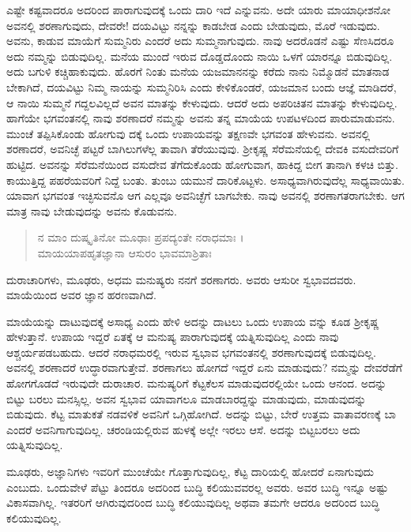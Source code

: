 ಎಷ್ಟೇ ಕಷ್ಟವಾದರೂ ಅದರಿಂದ ಪಾರಾಗುವುದಕ್ಕೆ ಒಂದು ದಾರಿ ಇದೆ ಎನ್ನುವನು. ಅದೇ ಯಾರು ಮಾಯಾಧೀಶನೋ ಅವನಲ್ಲಿ ಶರಣಾಗುವುದು, ದೇವರೇ! ದಯವಿಟ್ಟು ನನ್ನನ್ನು ಕಾಡಬೇಡ ಎಂದು ಬೇಡುವುದು, ಮೊರೆ ಇಡುವುದು. ಅವನು, ಕಾಡುವ ಮಾಯೆಗೆ ಸುಮ್ಮನಿರು ಎಂದರೆ ಅದು ಸುಮ್ಮನಾಗುವುದು. ನಾವು ಅದರೊಡನೆ ಎಷ್ಟು ಸೆಣಸಿದರೂ ಅದು ನಮ್ಮನ್ನು ಬಿಡುವುದಿಲ್ಲ. ಮನೆಯ ಮುಂದೆ ಇರುವ ದೊಡ್ಡದೊಂದು ನಾಯಿ ಒಳಗೆ ಯಾರನ್ನೂ ಬಿಡುವುದಿಲ್ಲ. ಅದು ಬಗುಳಿ ಕಚ್ಚಿಹಾಕುವುದು. ಹೊರಗೆ ನಿಂತು ಮನೆಯ ಯಜಮಾನನನ್ನು ಕರೆದು ನಾನು ನಿಮ್ಮೊಡನೆ ಮಾತನಾಡ ಬೇಕಾಗಿದೆ, ದಯವಿಟ್ಟು ನಿಮ್ಮ ನಾಯನ್ನು ಸುಮ್ಮನಿರಿಸಿ ಎಂದು ಕೇಳಿಕೊಂಡರೆ, ಯಜಮಾನ ಬಂದು ಆಜ್ಞೆ ಮಾಡಿದರೆ, ಆ ನಾಯಿ ಸುಮ್ಮನೆ ಗದ್ದಲವಿಲ್ಲದೆ ಅವನ ಮಾತನ್ನು ಕೇಳುವುದು. ಆದರೆ ಅದು ಅಪರಿಚಿತನ ಮಾತನ್ನು ಕೇಳುವುದಿಲ್ಲ. ಹಾಗೆಯೇ ಭಗವಂತನಲ್ಲಿ ನಾವು ಶರಣಾದರೆ ನಮ್ಮನ್ನು ಅವನು ತನ್ನ ಮಾಯೆಯ ಉಪಟಳದಿಂದ ಪಾರುಮಾಡುವನು. ಮುಂಚೆ ತಪ್ಪಿಸಿಕೊಂಡು ಹೋಗುವು ದಕ್ಕೆ ಒಂದು ಉಪಾಯವನ್ನು ತಕ್ಷಣವೇ ಭಗವಂತ ಹೇಳುವನು. ಅವನಲ್ಲಿ ಶರಣಾದರೆ, ಅವನಿಚ್ಛೆ ಪಟ್ಟರೆ ಬಾಗಿಲುಗಳೆಲ್ಲ ತಾವಾಗಿ ತೆರೆಯುವುವು. ಶ್ರೀಕೃಷ್ಣ ಸೆರೆಮನೆಯಲ್ಲಿ ದೇವಕಿ ವಸುದೇವರಿಗೆ ಹುಟ್ಟಿದ. ಅವನನ್ನು ಸೆರೆಮನೆಯಿಂದ ವಸುದೇವ ತೆಗೆದುಕೊಂಡು ಹೋಗುವಾಗ, ಹಾಕಿದ್ದ ಬೀಗ ತಾನಾಗಿ ಕಳಚಿ ಬಿತ್ತು. ಕಾಯುತ್ತಿದ್ದ ಪಹರೆಯವರಿಗೆ ನಿದ್ದೆ ಬಂತು. ತುಂಬು ಯಮುನೆ ದಾರಿಕೊಟ್ಟಳು. ಅಸಾಧ್ಯವಾಗಿರುವುದೆಲ್ಲ ಸಾಧ್ಯವಾಯಿತು. ಯಾವಾಗ ಭಗವಂತ ಇಚ್ಛಿಸುವನೊ ಆಗ ಎಲ್ಲವೂ ಅವನಿಚ್ಛೆಗೆ ಬಾಗಬೇಕು. ನಾವು ಅವನಲ್ಲಿ ಶರಣಾಗತರಾಗಬೇಕು. ಆಗ ಮಾತ್ರ ನಾವು ಬೇಡುವುದನ್ನು ಅವನು ಕೊಡುವನು.

\begin{verse}
ನ ಮಾಂ ದುಷ್ಕೃತಿನೋ ಮೂಢಾಃ ಪ್ರಪದ್ಯಂತೇ ನರಾಧಮಾಃ ।\\ಮಾಯಯಾಪಹೃತಜ್ಞಾನಾ ಆಸುರಂ ಭಾವಮಾಶ್ರಿತಾಃ 
\end{verse}

{\small ದುರಾಚಾರಿಗಳು, ಮೂಢರು, ಅಧಮ ಮನುಷ್ಯರು ನನಗೆ ಶರಣಾಗರು. ಅವರು ಆಸುರೀ ಸ್ವಭಾವದವರು. ಮಾಯೆಯಿಂದ ಅವರ ಜ್ಞಾನ ಹರಣವಾಗಿದೆ. }

ಮಾಯೆಯನ್ನು ದಾಟುವುದಕ್ಕೆ ಅಸಾಧ್ಯ ಎಂದು ಹೇಳಿ ಅದನ್ನು ದಾಟಲು ಒಂದು ಉಪಾಯ ವನ್ನು ಕೂಡ ಶ್ರೀಕೃಷ್ಣ ಹೇಳುತ್ತಾನೆ. ಉಪಾಯ ಇದ್ದರೆ ಏತಕ್ಕೆ ಆ ಮನುಷ್ಯ ಪಾರಾಗುವುದಕ್ಕೆ ಯತ್ನಿಸುವುದಿಲ್ಲ ಎಂದು ನಾವು ಆಶ್ಚರ್ಯಪಡಬಹುದು. ಆದರೆ ನರಾಧಮರಲ್ಲಿ ಇರುವ ಸ್ವಭಾವ ಭಗವಂತನಲ್ಲಿ ಶರಣಾಗುವುದಕ್ಕೆ ಬಿಡುವುದಿಲ್ಲ. ಅವನಲ್ಲಿ ಶರಣಾದರೆ ಉದ್ಧಾರವಾಗುತ್ತೇವೆ. ಶರಣಾಗಲು ಹೋಗದೆ ಇದ್ದರೆ ಏನು ಮಾಡುವುದು? ನಮ್ಮನ್ನು ದೇವರೆಡೆಗೆ ಹೋಗಗೊಡದೆ ಇರುವುದೇ ದುರಾಚಾರ. ಮನುಷ್ಯರಿಗೆ ಕೆಟ್ಟಕೆಲಸ ಮಾಡುವುದರಲ್ಲಿಯೇ ಒಂದು ಆನಂದ. ಅದನ್ನು ಬಿಟ್ಟು ಬರಲು ಮನಸ್ಸಿಲ್ಲ. ಅವನ ಸ್ವಭಾವ ಯಾವಾಗಲೂ ಮಾಡಬಾರದ್ದನ್ನು ಮಾಡುವುದು, ಮಾಡುವುದನ್ನು ಬಿಡುವುದು. ಕೆಟ್ಟ ಮಾತುಕತೆ ನಡವಳಿಕೆ ಅವನಿಗೆ ಒಗ್ಗಿಹೋಗಿದೆ. ಅದನ್ನು ಬಿಟ್ಟು, ಬೇರೆ ಉತ್ತಮ ವಾತಾವರಣಕ್ಕೆ ಬಾ ಎಂದರೆ ಅವನಿಗಾಗುವುದಿಲ್ಲ. ಚರಂಡಿಯಲ್ಲಿರುವ ಹುಳಕ್ಕೆ ಅಲ್ಲೇ ಇರಲು ಆಸೆ. ಅದನ್ನು ಬಿಟ್ಟಬರಲು ಅದು ಯತ್ನಿಸುವುದಿಲ್ಲ. 

ಮೂಢರು, ಅಜ್ಞಾನಿಗಳು ಇವರಿಗೆ ಮುಂಚೆಯೇ ಗೊತ್ತಾಗುವುದಿಲ್ಲ, ಕೆಟ್ಟ ದಾರಿಯಲ್ಲಿ ಹೋದರೆ ಏನಾಗುವುದು ಎಂಬುದು. ಒಂದುವೇಳೆ ಪೆಟ್ಟು ತಿಂದರೂ ಅದರಿಂದ ಬುದ್ಧಿ ಕಲಿಯುವವರಲ್ಲ ಅವರು. ಅವರ ಬುದ್ಧಿ ಇನ್ನೂ ಅಷ್ಟು ವಿಕಾಸವಾಗಿಲ್ಲ. ಇತರರಿಗೆ ಆಗಿರುವುದರಿಂದ ಬುದ್ಧಿ ಕಲಿಯುವುದಿಲ್ಲ ಅಥವಾ ತಮಗೇ ಆದರೂ ಅದರಿಂದ ಬುದ್ಧಿ ಕಲಿಯುವುದಿಲ್ಲ.

